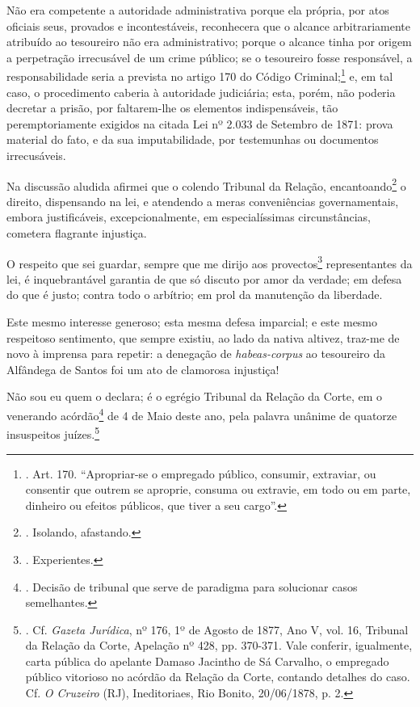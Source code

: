Não era competente a autoridade administrativa porque ela própria, por
atos oficiais seus, provados e incontestáveis, reconhecera que o alcance
arbitrariamente atribuído ao tesoureiro não era administrativo; porque o
alcance tinha por origem a perpetração irrecusável de um crime público;
se o tesoureiro fosse responsável, a responsabilidade seria a prevista
no artigo 170 do Código Criminal;\footnote{. Art. 170. ``Apropriar-se o
  empregado público, consumir, extraviar, ou consentir que outrem se
  aproprie, consuma ou extravie, em todo ou em parte, dinheiro ou
  efeitos públicos, que tiver a seu cargo''.} e, em tal caso, o
procedimento caberia à autoridade judiciária; esta, porém, não poderia
decretar a prisão, por faltarem-lhe os elementos indispensáveis, tão
peremptoriamente exigidos na citada Lei nº 2.033 de Setembro de 1871:
prova material do fato, e da sua imputabilidade, por testemunhas ou
documentos irrecusáveis.

Na discussão aludida afirmei que o colendo Tribunal da Relação,
encantoando\footnote{. Isolando, afastando.} o direito, dispensando na
lei, e atendendo a meras conveniências governamentais, embora
justificáveis, excepcionalmente, em especialíssimas circunstâncias,
cometera flagrante injustiça.

O respeito que sei guardar, sempre que me dirijo aos provectos\footnote{.
  Experientes.} representantes da lei, é inquebrantável garantia de que
só discuto por amor da verdade; em defesa do que é justo; contra todo o
arbítrio; em prol da manutenção da liberdade.

Este mesmo interesse generoso; esta mesma defesa imparcial; e este mesmo
respeitoso sentimento, que sempre existiu, ao lado da nativa altivez,
traz-me de novo à imprensa para repetir: a denegação de
\emph{habeas-corpus} ao tesoureiro da Alfândega de Santos foi um ato de
clamorosa injustiça!

Não sou eu quem o declara; é o egrégio Tribunal da Relação da Corte, em
o venerando acórdão\footnote{. Decisão de tribunal que serve de
  paradigma para solucionar casos semelhantes.} de 4 de Maio deste ano,
pela palavra unânime de quatorze insuspeitos juízes.\footnote{. Cf.
  \emph{Gazeta Jurídica}, nº 176, 1º de Agosto de 1877, Ano V, vol. 16,
  Tribunal da Relação da Corte, Apelação nº 428, pp. 370-371. Vale
  conferir, igualmente, carta pública do apelante Damaso Jacintho de Sá
  Carvalho, o empregado público vitorioso no acórdão da Relação da
  Corte, contando detalhes do caso. Cf. \emph{O Cruzeiro} (RJ),
  Ineditoriaes, Rio Bonito, 20/06/1878, p. 2.}

